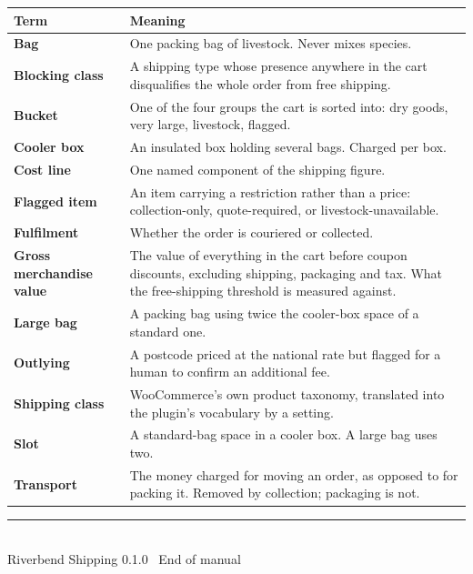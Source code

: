 \documentclass[11pt,a4paper,oneside]{report}
\begin{document}
\begin{longtable}{@{}L{4.4cm}L{10.4cm}@{}}
\toprule
\textbf{Term} & \textbf{Meaning}\\
\midrule
\endhead
\textbf{Bag} & One packing bag of livestock. Never mixes species.\\
\textbf{Blocking class} & A shipping type whose presence anywhere in the cart
disqualifies the whole order from free shipping.\\
\textbf{Bucket} & One of the four groups the cart is sorted into: dry goods, very
large, livestock, flagged.\\
\textbf{Cooler box} & An insulated box holding several bags. Charged per box.\\
\textbf{Cost line} & One named component of the shipping figure.\\
\textbf{Flagged item} & An item carrying a restriction rather than a price:
collection-only, quote-required, or livestock-unavailable.\\
\textbf{Fulfilment} & Whether the order is couriered or collected.\\
\textbf{Gross merchandise value} & The value of everything in the cart before coupon
discounts, excluding shipping, packaging and tax. What the free-shipping threshold is
measured against.\\
\textbf{Large bag} & A packing bag using twice the cooler-box space of a standard one.\\
\textbf{Outlying} & A postcode priced at the national rate but flagged for a human to
confirm an additional fee.\\
\textbf{Shipping class} & WooCommerce's own product taxonomy, translated into the
plugin's vocabulary by a setting.\\
\textbf{Slot} & A standard-bag space in a cooler box. A large bag uses two.\\
\textbf{Transport} & The money charged for moving an order, as opposed to for packing
it. Removed by collection; packaging is not.\\
\bottomrule
\end{longtable}

\vspace{2cm}
\begin{center}
{\color{accent}\rule{6cm}{1pt}}\\[8pt]
{\sffamily\footnotesize\color{muted}Riverbend Shipping 0.1.0 \textbullet\ End of manual}
\end{center}
\end{document}
